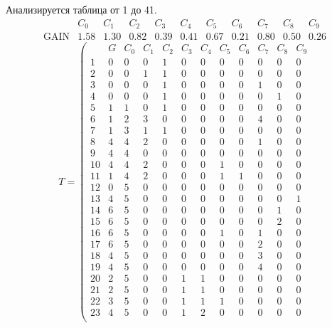 
Анализируется таблица от 1 до 41.
$$ 
\begin{array}{l|c|ccccccccc}
	  & C_{0} & C_{1} & C_{2} & C_{3} & C_{4} & C_{5} & C_{6} & C_{7} & C_{8} & C_{9}\\
 \textrm{GAIN} & 1.58 & 1.30 & 0.82 & 0.39 & 0.41 & 0.67 & 0.21 & 0.80 & 0.50 & 0.26
\end{array}
 $$
$$
T = \left( \begin{array}{lc|c|ccccccccc}
	 & G & C_{0} & C_{1} & C_{2} & C_{3} & C_{4} & C_{5} & C_{6} & C_{7} & C_{8} & C_{9}\\
	1 & 0 & 0 & 0 & 1 & 0 & 0 & 0 & 0 & 0 & 0 & 0\\
	2 & 0 & 0 & 1 & 1 & 0 & 0 & 0 & 0 & 0 & 0 & 0\\
	3 & 0 & 0 & 0 & 1 & 0 & 0 & 0 & 0 & 1 & 0 & 0\\
	4 & 0 & 0 & 0 & 1 & 0 & 0 & 0 & 0 & 0 & 1 & 0\\
	5 & 1 & 1 & 0 & 1 & 0 & 0 & 0 & 0 & 0 & 0 & 0\\
	6 & 1 & 2 & 3 & 0 & 0 & 0 & 0 & 0 & 4 & 0 & 0\\
	7 & 1 & 3 & 1 & 1 & 0 & 0 & 0 & 0 & 0 & 0 & 0\\
	8 & 4 & 4 & 2 & 0 & 0 & 0 & 0 & 0 & 1 & 0 & 0\\
	9 & 4 & 4 & 0 & 0 & 0 & 0 & 0 & 0 & 0 & 0 & 0\\
	10 & 4 & 4 & 2 & 0 & 0 & 0 & 1 & 0 & 0 & 0 & 0\\
	11 & 1 & 4 & 2 & 0 & 0 & 0 & 1 & 1 & 0 & 0 & 0\\
	12 & 0 & 5 & 0 & 0 & 0 & 0 & 0 & 0 & 0 & 0 & 0\\
	13 & 4 & 5 & 0 & 0 & 0 & 0 & 0 & 0 & 0 & 0 & 1\\
	14 & 6 & 5 & 0 & 0 & 0 & 0 & 0 & 0 & 0 & 1 & 0\\
	15 & 6 & 5 & 0 & 0 & 0 & 0 & 0 & 0 & 0 & 2 & 0\\
	16 & 6 & 5 & 0 & 0 & 0 & 0 & 1 & 0 & 1 & 0 & 0\\
	17 & 6 & 5 & 0 & 0 & 0 & 0 & 0 & 0 & 2 & 0 & 0\\
	18 & 4 & 5 & 0 & 0 & 0 & 0 & 0 & 0 & 3 & 0 & 0\\
	19 & 4 & 5 & 0 & 0 & 0 & 0 & 0 & 0 & 4 & 0 & 0\\
	20 & 2 & 5 & 0 & 0 & 1 & 1 & 0 & 0 & 0 & 0 & 0\\
	21 & 2 & 5 & 0 & 0 & 1 & 1 & 0 & 0 & 0 & 0 & 0\\
	22 & 3 & 5 & 0 & 0 & 1 & 1 & 1 & 0 & 0 & 0 & 0\\
	23 & 4 & 5 & 0 & 0 & 1 & 2 & 0 & 0 & 0 & 0 & 0\\

\end{array}$$

